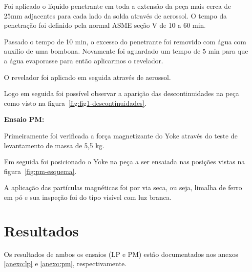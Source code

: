 \documentclass[12pt,oneside]{article}
\begin{document}
Foi aplicado o líquido penetrante em toda a extensão da peça mais cerca
de 25mm adjacentes para cada lado da solda através de aerossol. O tempo
da penetração foi definido pela normal ASME seção V de 10 a 60 min.

Passado o tempo de 10 min, o excesso do penetrante foi removido com água
com auxílio de uma bombona. Novamente foi aguardado um tempo de 5 min
para que a água evaporasse para então aplicarmos o revelador.

O revelador foi aplicado em seguida através de aerossol.

Logo em seguida foi possível observar a aparição das descontinuidades na peça
como visto na figura~\ref{fig:fig1-descontinuidades}.

\textbf{Ensaio PM:}

Primeiramente foi verificada a força magnetizante do Yoke através do teste
de levantamento de massa de 5,5 kg.

Em seguida foi posicionado o Yoke na peça a ser ensaiada nas posições
vistas na figura~\ref{fig:pm-esquema}.

A aplicação das partículas magnéticas foi por via seca, ou seja, limalha de
ferro em pó e sua inspeção foi do tipo visível com luz branca.

\section{Resultados}
Os resultados de ambos os ensaios (LP e PM) estão documentados nos anexos \ref{anexo:lp} e \ref{anexo:pm}, respectivamente.

\clearpage
\end{document}
